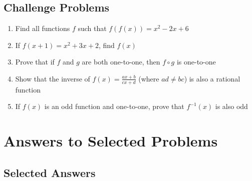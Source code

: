 \documentclass[12pt,a4paper]{article}
\begin{document}
\subsection{Challenge Problems}

\begin{enumerate}[resume]
    \item Find all functions $f$ such that $f(f(x)) = x^2 - 2x + 6$
    
    \item If $f(x+1) = x^2 + 3x + 2$, find $f(x)$
    
    \item Prove that if $f$ and $g$ are both one-to-one, then $f \circ g$ is one-to-one
    
    \item Show that the inverse of $f(x) = \frac{ax+b}{cx+d}$ (where $ad \neq bc$) is also a rational function
    
    \item If $f(x)$ is an odd function and one-to-one, prove that $f^{-1}(x)$ is also odd
\end{enumerate}

\section{Answers to Selected Problems}

\subsection{Selected Answers}
\end{document}
